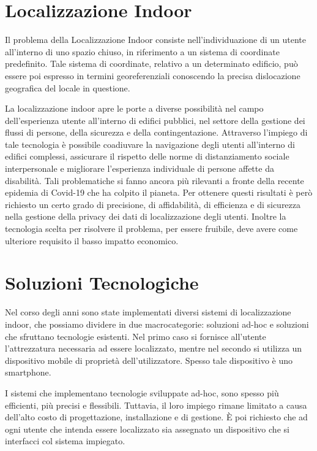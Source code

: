 \documentclass[draft]{standalone}
\begin{document}
\section{Localizzazione Indoor}
Il problema della Localizzazione Indoor consiste nell'individuazione di un
utente all'interno di uno spazio chiuso, in riferimento a un sistema di
coordinate predefinito. Tale sistema di coordinate, relativo a un determinato
edificio, può essere poi espresso in termini georeferenziali conoscendo la
precisa dislocazione geografica del locale in questione. 

La localizzazione indoor apre le porte a diverse possibilità nel campo
dell'esperienza utente all'interno di edifici pubblici, nel settore della
gestione dei flussi di persone, della sicurezza e della contingentazione.
Attraverso l'impiego di tale tecnologia è possibile coadiuvare la navigazione
degli utenti all'interno di edifici complessi, assicurare il rispetto delle
norme di distanziamento sociale interpersonale e migliorare l'esperienza
individuale di persone affette da disabilità. Tali problematiche si fanno
ancora più rilevanti a fronte della recente epidemia di Covid-19 che ha colpito
il pianeta. Per ottenere questi risultati è però richiesto un certo grado di
precisione, di affidabilità, di efficienza e di sicurezza nella gestione della
privacy dei dati di localizzazione degli utenti. Inoltre la tecnologia scelta
per risolvere il problema, per essere fruibile, deve avere come ulteriore
requisito il basso impatto economico.

\section{Soluzioni Tecnologiche}
Nel corso degli anni sono state implementati diversi sistemi di localizzazione
indoor, che possiamo dividere in due macrocategorie: soluzioni ad-hoc e
soluzioni che sfruttano tecnologie esistenti. Nel primo caso si fornisce
all'utente l'attrezzatura necessaria ad essere localizzato, mentre nel secondo
si utilizza un dispositivo mobile di proprietà dell'utilizzatore.  Spesso tale
dispositivo è uno smartphone. 

I sistemi che implementano tecnologie sviluppate ad-hoc, sono spesso più
efficienti, più precisi e flessibili. Tuttavia, il loro impiego rimane limitato
a causa dell'alto costo di progettazione, installazione e di gestione. È poi
richiesto che ad ogni utente che intenda essere localizzato sia assegnato un
dispositivo che si interfacci col sistema impiegato.
\end{document}
